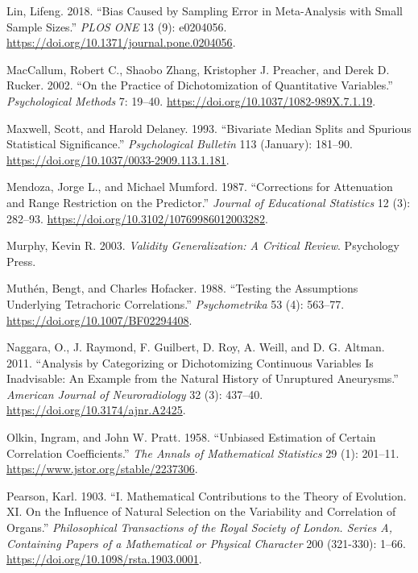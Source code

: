 \documentclass[
  letterpaper,
  DIV=11,
  numbers=noendperiod]{scrreprt}
\newlength{\cslhangindent}
\newlength{\cslentryspacingunit} %
\newenvironment{CSLReferences}[2] %
 {%
  \setlength{\parindent}{0pt}
  \ifodd #1
  \let\oldpar\par
  \def\par{\hangindent=\cslhangindent\oldpar}
  \fi
  \setlength{\parskip}{#2\cslentryspacingunit}
 }%
 {}
\begin{document}
\begin{CSLReferences}{1}{0}
\leavevmode{}%
Lin, Lifeng. 2018. {``Bias Caused by Sampling Error in Meta-Analysis
with Small Sample Sizes.''} \emph{PLOS ONE} 13 (9): e0204056.
\url{https://doi.org/10.1371/journal.pone.0204056}.

\leavevmode{}%
MacCallum, Robert C., Shaobo Zhang, Kristopher J. Preacher, and Derek D.
Rucker. 2002. {``On the Practice of Dichotomization of Quantitative
Variables.''} \emph{Psychological Methods} 7: 19--40.
\url{https://doi.org/10.1037/1082-989X.7.1.19}.

\leavevmode{}%
Maxwell, Scott, and Harold Delaney. 1993. {``Bivariate Median Splits and
Spurious Statistical Significance.''} \emph{Psychological Bulletin} 113
(January): 181--90. \url{https://doi.org/10.1037/0033-2909.113.1.181}.

\leavevmode{}%
Mendoza, Jorge L., and Michael Mumford. 1987. {``Corrections for
Attenuation and Range Restriction on the Predictor.''} \emph{Journal of
Educational Statistics} 12 (3): 282--93.
\url{https://doi.org/10.3102/10769986012003282}.

\leavevmode{}%
Murphy, Kevin R. 2003. \emph{Validity Generalization: A Critical
Review}. Psychology Press.

\leavevmode{}%
Muthén, Bengt, and Charles Hofacker. 1988. {``Testing the Assumptions
Underlying Tetrachoric Correlations.''} \emph{Psychometrika} 53 (4):
563--77. \url{https://doi.org/10.1007/BF02294408}.

\leavevmode{}%
Naggara, O., J. Raymond, F. Guilbert, D. Roy, A. Weill, and D. G.
Altman. 2011. {``Analysis by Categorizing or Dichotomizing Continuous
Variables Is Inadvisable: An Example from the Natural History of
Unruptured Aneurysms.''} \emph{American Journal of Neuroradiology} 32
(3): 437--40. \url{https://doi.org/10.3174/ajnr.A2425}.

\leavevmode{}%
Olkin, Ingram, and John W. Pratt. 1958. {``Unbiased Estimation of
Certain Correlation Coefficients.''} \emph{The Annals of Mathematical
Statistics} 29 (1): 201--11. \url{https://www.jstor.org/stable/2237306}.

\leavevmode{}%
Pearson, Karl. 1903. {``I. Mathematical Contributions to the Theory of
Evolution. {\textemdash}XI. On the Influence of Natural Selection on the
Variability and Correlation of Organs.''} \emph{Philosophical
Transactions of the Royal Society of London. Series A, Containing Papers
of a Mathematical or Physical Character} 200 (321-330): 1--66.
\url{https://doi.org/10.1098/rsta.1903.0001}.


\end{CSLReferences}
\end{document}
